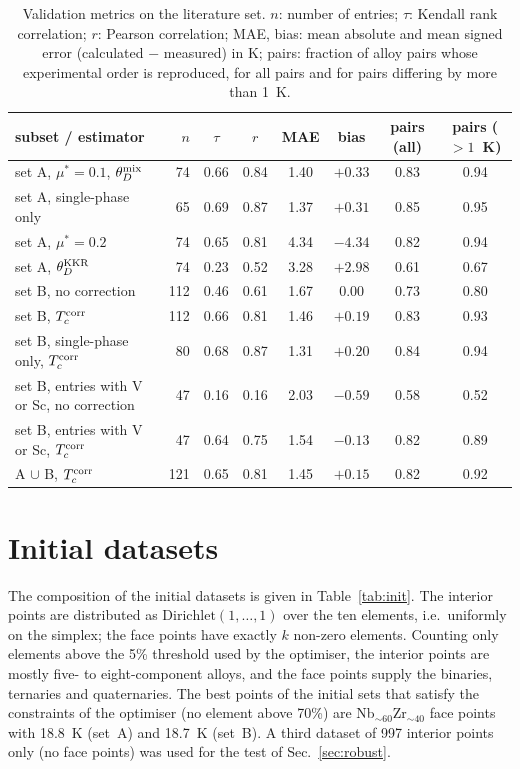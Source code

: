 \documentclass[aps,prb,preprint,superscriptaddress,floatfix]{revtex4-2}
\begin{document}
\begin{table}
\caption{Validation metrics on the literature set. $n$: number of entries; $\tau$: Kendall
rank correlation; $r$: Pearson correlation; MAE, bias: mean absolute and mean signed error
(calculated $-$ measured) in K; pairs: fraction of alloy pairs whose experimental order is
reproduced, for all pairs and for pairs differing by more than 1~K.}
\label{tab:metrics}
\begin{ruledtabular}
\begin{tabular}{lrcccccc}
subset / estimator & $n$ & $\tau$ & $r$ & MAE & bias & pairs (all) & pairs ($>1$~K) \\
\hline
set A, $\mu^*=0.1$, $\theta_D^{\rm mix}$ & 74 & 0.66 & 0.84 & 1.40 & $+0.33$ & 0.83 & 0.94 \\
set A, single-phase only & 65 & 0.69 & 0.87 & 1.37 & $+0.31$ & 0.85 & 0.95 \\
set A, $\mu^*=0.2$ & 74 & 0.65 & 0.81 & 4.34 & $-4.34$ & 0.82 & 0.94 \\
set A, $\theta_D^{\rm KKR}$ & 74 & 0.23 & 0.52 & 3.28 & $+2.98$ & 0.61 & 0.67 \\
set B, no correction & 112 & 0.46 & 0.61 & 1.67 & $0.00$ & 0.73 & 0.80 \\
set B, $T_c^{\rm corr}$ & 112 & 0.66 & 0.81 & 1.46 & $+0.19$ & 0.83 & 0.93 \\
set B, single-phase only, $T_c^{\rm corr}$ & 80 & 0.68 & 0.87 & 1.31 & $+0.20$ & 0.84 & 0.94 \\
set B, entries with V or Sc, no correction & 47 & 0.16 & 0.16 & 2.03 & $-0.59$ & 0.58 & 0.52 \\
set B, entries with V or Sc, $T_c^{\rm corr}$ & 47 & 0.64 & 0.75 & 1.54 & $-0.13$ & 0.82 & 0.89 \\
A $\cup$ B, $T_c^{\rm corr}$ & 121 & 0.65 & 0.81 & 1.45 & $+0.15$ & 0.82 & 0.92 \\
\end{tabular}
\end{ruledtabular}
\end{table}

\clearpage
\section{Initial datasets}
\label{sec:init}

The composition of the initial datasets is given in Table~\ref{tab:init}. The interior
points are distributed as $\mathrm{Dirichlet}(1,\dots,1)$ over the ten elements, i.e.\
uniformly on the simplex; the face points have exactly $k$ non-zero elements. Counting only
elements above the 5\% threshold used by the optimiser, the interior points are mostly
five- to eight-component alloys, and the face points supply the binaries, ternaries and
quaternaries. The best points of the initial sets that satisfy the constraints of the
optimiser (no element above 70\%) are Nb$_{\sim 60}$Zr$_{\sim 40}$ face points with
18.8~K (set~A) and 18.7~K (set~B). A third dataset of 997 interior points only (no face points) was used
for the test of Sec.~\ref{sec:robust}.
\end{document}
